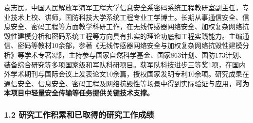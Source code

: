 袁志民，中国人民解放军海军工程大学信息安全系密码系统工程教研室副主任，专业技术上校、讲师，国防科技大学系统工程专业工学博士。长期从事通信安全、信息安全、密码工程等方面教学科研工作，在无线传感器网络安全、加权复杂网络抗毁性建模分析和密码系统工程等方向具有扎实的理论功底和工程实践能力。主编通信、密码等教材10余部，参著《无线传感器网络安全与加权复杂网络抗毁性建模分析》等学术专著3部，主持参与国家自然科学基金、国家863计划、国防173计划、装备综合研究等多项国家级和军队科研项目。获军队科技进步三等奖1项，在国内外学术期刊与国际会议上发表论文10余篇，授权国家发明专利10余项。研究成果在通信安全、信息安全、密码工程及网络抗毁性等场景中得到实际验证与应用，\textbf{可为本项目中轻量安全传输等任务提供关键技术支撑。}


\vspace{0.3cm}

\subsubsection{1.2 研究工作积累和已取得的研究工作成绩}


